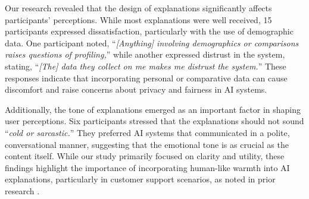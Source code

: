 
Our research revealed that the design of explanations significantly affects participants' perceptions. While most explanations were well received, 15 participants expressed dissatisfaction, particularly with the use of demographic data. One participant noted, ``{\it [Anything] involving demographics or comparisons raises questions of profiling,}'' while another expressed distrust in the system, stating, ``{\it [The] data they collect on me makes me distrust the system.}'' These responses indicate that incorporating personal or comparative data can cause discomfort and raise concerns about privacy and fairness in AI systems.

Additionally, the tone of explanations emerged as an important factor in shaping user perceptions. Six participants stressed that the explanations should not sound ``{\it cold or sarcastic.}'' They preferred AI systems that communicated in a polite, conversational manner, suggesting that the emotional tone is as crucial as the content itself. While our study primarily focused on clarity and utility, these findings highlight the importance of incorporating human-like warmth into AI explanations, particularly in customer support scenarios, as noted in prior research \cite{UnderstandingBenefitsChallengesDeployingConversationala}.



